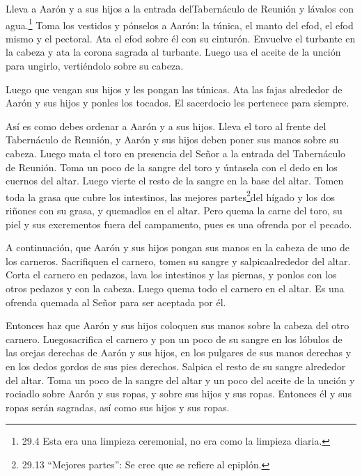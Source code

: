  Lleva a Aarón y a sus hijos a la entrada delTabernáculo de
Reunión y lávalos con agua.\footnote{29.4 Esta era una limpieza
  ceremonial, no era como la limpieza diaria.}  Toma los
vestidos y pónselos a Aarón: la túnica, el manto del efod, el efod mismo
y el pectoral. Ata el efod sobre él con su cinturón. 
Envuelve el turbante en la cabeza y ata la corona sagrada al turbante.
 Luego usa el aceite de la unción para ungirlo, vertiéndolo
sobre su cabeza.

 Luego que vengan sus hijos y les pongan las túnicas.
 Ata las fajas alrededor de Aarón y sus hijos y ponles los
tocados. El sacerdocio les pertenece para siempre.

Así es como debes ordenar a Aarón y a sus hijos.  Lleva el
toro al frente del Tabernáculo de Reunión, y Aarón y sus hijos deben
poner sus manos sobre su cabeza.  Luego mata el toro en
presencia del Señor a la entrada del Tabernáculo de Reunión.
 Toma un poco de la sangre del toro y úntasela con el dedo
en los cuernos del altar. Luego vierte el resto de la sangre en la base
del altar.  Tomen toda la grasa que cubre los intestinos,
las mejores partes\footnote{29.13 ``Mejores partes'': Se cree que se
  refiere al epiplón.}del hígado y los dos riñones con su grasa, y
quemadlos en el altar.  Pero quema la carne del toro, su
piel y sus excrementos fuera del campamento, pues es una ofrenda por el
pecado.

 A continuación, que Aarón y sus hijos pongan sus manos en
la cabeza de uno de los carneros.  Sacrifiquen el carnero,
tomen su sangre y salpicaalrededor del altar.  Corta el
carnero en pedazos, lava los intestinos y las piernas, y ponlos con los
otros pedazos y con la cabeza.  Luego quema todo el carnero
en el altar. Es una ofrenda quemada al Señor para ser aceptada por él.

 Entonces haz que Aarón y sus hijos coloquen sus manos
sobre la cabeza del otro carnero.  Luegosacrifica el
carnero y pon un poco de su sangre en los lóbulos de las orejas derechas
de Aarón y sus hijos, en los pulgares de sus manos derechas y en los
dedos gordos de sus pies derechos. Salpica el resto de su sangre
alrededor del altar.  Toma un poco de la sangre del altar y
un poco del aceite de la unción y rociadlo sobre Aarón y sus ropas, y
sobre sus hijos y sus ropas. Entonces él y sus ropas serán sagradas, así
como sus hijos y sus ropas.

